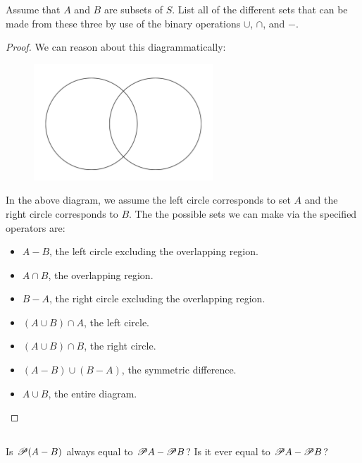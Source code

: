 \documentclass{report}
\begin{document}
  Assume that $A$ and $B$ are subsets of $S$.
  List all of the different sets that can be made from these three by use of the
    binary operations $\cup$, $\cap$, and $-$.

  \begin{proof}
    We can reason about this diagrammatically:

    \begin{figure}[ht]
      \includegraphics[width=0.6\textwidth]{venn-diagram}
      \centering
    \end{figure}

    In the above diagram, we assume the left circle corresponds to set $A$ and the
      right circle corresponds to $B$.
    The the possible sets we can make via the specified operators are:

    \begin{itemize}
      \item $A - B$, the left circle excluding the overlapping region.
      \item $A \cap B$, the overlapping region.
      \item $B - A$, the right circle excluding the overlapping region.
      \item $(A \cup B) \cap A$, the left circle.
      \item $(A \cup B) \cap B$, the right circle.
      \item $(A - B) \cup (B - A)$, the symmetric difference.
      \item $A \cup B$, the entire diagram.
    \end{itemize}
  \end{proof}

\subsection{}%

  Is $\mathscr{P}(A - B)$ always equal to $\mathscr{P}A - \mathscr{P}B$?
  Is it ever equal to $\mathscr{P}A - \mathscr{P}B$?
\end{document}
